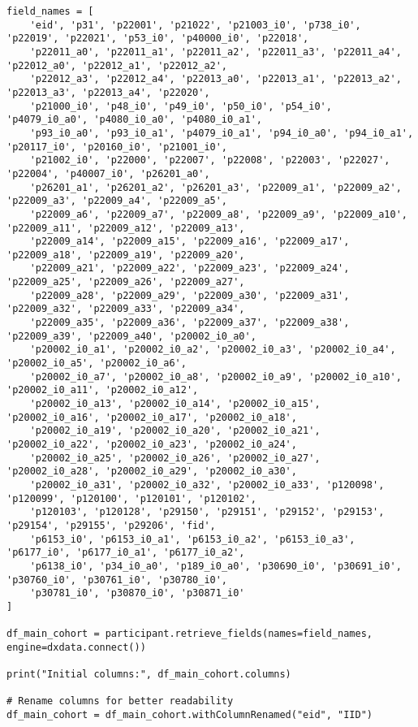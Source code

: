 \documentclass[11pt]{article}
\begin{document}
\begin{lstlisting}[style=PythonStyle]
field_names = [
    'eid', 'p31', 'p22001', 'p21022', 'p21003_i0', 'p738_i0', 'p22019', 'p22021', 'p53_i0', 'p40000_i0', 'p22018', 
    'p22011_a0', 'p22011_a1', 'p22011_a2', 'p22011_a3', 'p22011_a4', 'p22012_a0', 'p22012_a1', 'p22012_a2', 
    'p22012_a3', 'p22012_a4', 'p22013_a0', 'p22013_a1', 'p22013_a2', 'p22013_a3', 'p22013_a4', 'p22020', 
    'p21000_i0', 'p48_i0', 'p49_i0', 'p50_i0', 'p54_i0', 'p4079_i0_a0', 'p4080_i0_a0', 'p4080_i0_a1', 
    'p93_i0_a0', 'p93_i0_a1', 'p4079_i0_a1', 'p94_i0_a0', 'p94_i0_a1', 'p20117_i0', 'p20160_i0', 'p21001_i0', 
    'p21002_i0', 'p22000', 'p22007', 'p22008', 'p22003', 'p22027', 'p22004', 'p40007_i0', 'p26201_a0', 
    'p26201_a1', 'p26201_a2', 'p26201_a3', 'p22009_a1', 'p22009_a2', 'p22009_a3', 'p22009_a4', 'p22009_a5', 
    'p22009_a6', 'p22009_a7', 'p22009_a8', 'p22009_a9', 'p22009_a10', 'p22009_a11', 'p22009_a12', 'p22009_a13', 
    'p22009_a14', 'p22009_a15', 'p22009_a16', 'p22009_a17', 'p22009_a18', 'p22009_a19', 'p22009_a20', 
    'p22009_a21', 'p22009_a22', 'p22009_a23', 'p22009_a24', 'p22009_a25', 'p22009_a26', 'p22009_a27', 
    'p22009_a28', 'p22009_a29', 'p22009_a30', 'p22009_a31', 'p22009_a32', 'p22009_a33', 'p22009_a34', 
    'p22009_a35', 'p22009_a36', 'p22009_a37', 'p22009_a38', 'p22009_a39', 'p22009_a40', 'p20002_i0_a0', 
    'p20002_i0_a1', 'p20002_i0_a2', 'p20002_i0_a3', 'p20002_i0_a4', 'p20002_i0_a5', 'p20002_i0_a6', 
    'p20002_i0_a7', 'p20002_i0_a8', 'p20002_i0_a9', 'p20002_i0_a10', 'p20002_i0_a11', 'p20002_i0_a12', 
    'p20002_i0_a13', 'p20002_i0_a14', 'p20002_i0_a15', 'p20002_i0_a16', 'p20002_i0_a17', 'p20002_i0_a18', 
    'p20002_i0_a19', 'p20002_i0_a20', 'p20002_i0_a21', 'p20002_i0_a22', 'p20002_i0_a23', 'p20002_i0_a24', 
    'p20002_i0_a25', 'p20002_i0_a26', 'p20002_i0_a27', 'p20002_i0_a28', 'p20002_i0_a29', 'p20002_i0_a30', 
    'p20002_i0_a31', 'p20002_i0_a32', 'p20002_i0_a33', 'p120098', 'p120099', 'p120100', 'p120101', 'p120102', 
    'p120103', 'p120128', 'p29150', 'p29151', 'p29152', 'p29153', 'p29154', 'p29155', 'p29206', 'fid', 
    'p6153_i0', 'p6153_i0_a1', 'p6153_i0_a2', 'p6153_i0_a3', 'p6177_i0', 'p6177_i0_a1', 'p6177_i0_a2', 
    'p6138_i0', 'p34_i0_a0', 'p189_i0_a0', 'p30690_i0', 'p30691_i0', 'p30760_i0', 'p30761_i0', 'p30780_i0', 
    'p30781_i0', 'p30870_i0', 'p30871_i0'
]

df_main_cohort = participant.retrieve_fields(names=field_names, engine=dxdata.connect())

print("Initial columns:", df_main_cohort.columns)

# Rename columns for better readability
df_main_cohort = df_main_cohort.withColumnRenamed("eid", "IID")


\end{lstlisting}
\end{document}
